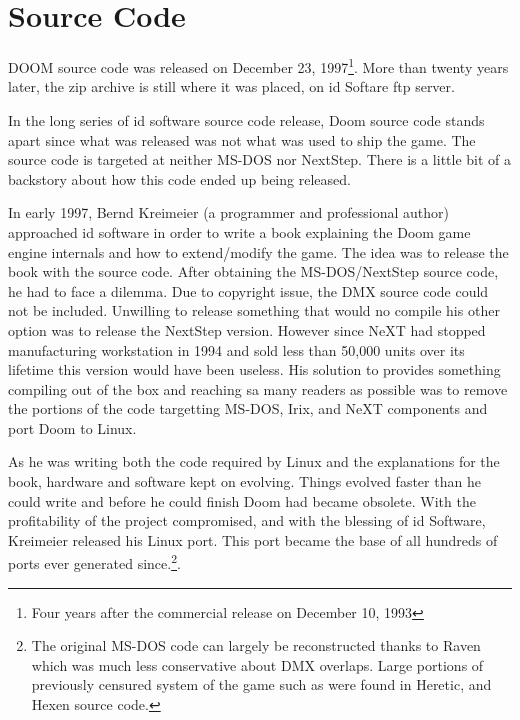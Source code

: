 \section{Source Code}
DOOM source code was released on December 23, 1997\footnote{Four years after the commercial release on December 10, 1993}. More than twenty years later, the zip archive is still where it was placed, on id Softare ftp server.\\
\par
{}
\par
 In the long series of id software source code release, Doom source code stands apart since what was released was not what was used to ship the game. The source code is targeted at neither MS-DOS nor NextStep. There is a little bit of a backstory about how this code ended up being released.\\
 \par
 In early 1997, Bernd Kreimeier (a programmer and professional author) approached id software in order to write a book explaining the Doom game engine internals and how to extend/modify the game. The idea was to release the book with the source code. After obtaining the MS-DOS/NextStep source code, he had to face a dilemma. Due to copyright issue, the DMX source code could not be included. Unwilling to release something that would no compile his other option was to release the NextStep version. However since NeXT had stopped manufacturing workstation in 1994 and sold less than 50,000 units over its lifetime this version would have been useless. His solution to provides something compiling out of the box and reaching sa many readers as possible was to remove the portions of the code targetting MS-DOS, Irix, and NeXT components and port Doom to Linux.\\
\par
 As he was writing both the code required by Linux and the explanations for the book, hardware and software kept on evolving. Things evolved faster than he could write and before he could finish Doom had became obsolete. With the profitability of the project compromised, and with the blessing of id Software, Kreimeier released his Linux port. This port became the base of all hundreds of ports ever generated since.\footnote{The original MS-DOS code can largely be reconstructed thanks to Raven which was much less conservative about DMX overlaps. Large portions of previously censured system of the game such as  were found in Heretic, and Hexen source code.}.\\
 \par  


